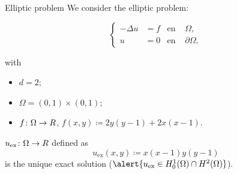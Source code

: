 	\begin{frame}{Elliptic problem}
		We consider the elliptic problem:
		\begin{block}{}
		\begin{equation*}
		\left\{
		\begin{aligned}
		-\Delta u&=f & \text{en } &\Omega, \\
		u&=0 & \text{en } &\partial\Omega,
		\end{aligned}
		\right.
		\end{equation*}
		\end{block}
		with
		\begin{itemize}
			\item $d=2$;
			\item $\Omega=(0,1)\times(0,1)$;
			\item $f\colon\Omega\to\relax R$, $f(x,y)\coloneqq2y(y-1) + 2x(x-1)$.
		\end{itemize}
		\vspace*{0.3cm}
		
		$u_{\text{ex}}\colon\Omega\to\relax R$ defined as
		\begin{equation*}
		\label{sol_experimento_eliptico}
		u_{\text{ex}}(x,y)\coloneqq x(x-1)y(y-1)
		\end{equation*}
		is the \alert{unique exact solution} ($\alert{u_{\text{ex}}\in H_0^1(\Omega)\cap H^2(\Omega)}$).
		\end{frame}

